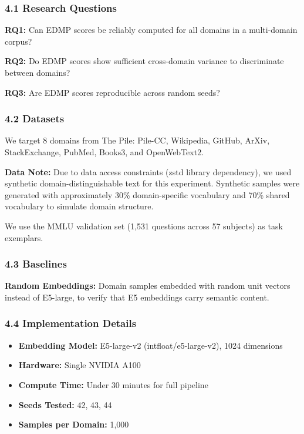 
\subsubsection{4.1 Research Questions}

\textbf{RQ1:} Can EDMP scores be reliably computed for all domains in a multi-domain corpus?

\textbf{RQ2:} Do EDMP scores show sufficient cross-domain variance to discriminate between domains?

\textbf{RQ3:} Are EDMP scores reproducible across random seeds?

\subsubsection{4.2 Datasets}

We target 8 domains from The Pile: Pile-CC, Wikipedia, GitHub, ArXiv, StackExchange, PubMed, Books3, and OpenWebText2.

\textbf{Data Note:} Due to data access constraints (zstd library dependency), we used synthetic domain-distinguishable text for this experiment. Synthetic samples were generated with approximately 30\% domain-specific vocabulary and 70\% shared vocabulary to simulate domain structure.

We use the MMLU validation set (1,531 questions across 57 subjects) as task exemplars.

\subsubsection{4.3 Baselines}

\textbf{Random Embeddings:} Domain samples embedded with random unit vectors instead of E5-large, to verify that E5 embeddings carry semantic content.

\subsubsection{4.4 Implementation Details}

\begin{itemize}
\item \textbf{Embedding Model:} E5-large-v2 (intfloat/e5-large-v2), 1024 dimensions
\item \textbf{Hardware:} Single NVIDIA A100
\item \textbf{Compute Time:} Under 30 minutes for full pipeline
\item \textbf{Seeds Tested:} 42, 43, 44
\item \textbf{Samples per Domain:} 1,000
\end{itemize}

